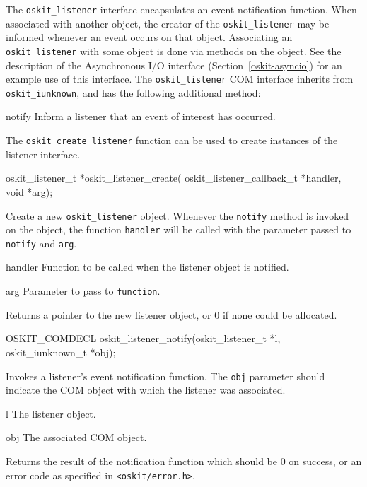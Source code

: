 \label{oskit-listener}
The {\tt oskit_listener} interface encapsulates an event notification function.
When associated with another object, the creator of the \texttt{oskit_listener}
may be informed whenever an event occurs on that object.
Associating an \texttt{oskit_listener} with some object is done via methods
on the object.
See the description of the Asynchronous I/O interface
(Section~\ref{oskit-asyncio}) for an example use of this interface.
The {\tt oskit_listener} COM interface inherits from {\tt oskit_iunknown},
and has the following additional method:
\begin{csymlist}
\item[notify]
	Inform a listener that an event of interest has occurred.
\end{csymlist}
The \texttt{oskit_create_listener} function can be used to create instances of
the listener interface.

\begin{apisyn}

	\funcproto oskit_listener_t *oskit_listener_create(
		oskit_listener_callback_t *handler, void *arg);
\end{apisyn}
\begin{apidesc}
	Create a new \texttt{oskit_listener} object.
	Whenever the \texttt{notify} method is invoked on the object, 
	the function \texttt{handler} will be called with the parameter
	passed to \texttt{notify} and \texttt{arg}.
\end{apidesc}
\begin{apiparm}
	\item[handler]
		Function to be called when the listener object is notified.
	\item[arg]
		Parameter to pass to \texttt{function}.
\end{apiparm}
\begin{apiret}
	Returns a pointer to the new listener object,
	or 0 if none could be allocated.
\end{apiret}

\begin{apisyn}

	\funcproto OSKIT_COMDECL
	oskit_listener_notify(oskit_listener_t *l, oskit_iunknown_t *obj);
\end{apisyn}
\begin{apidesc}
	Invokes a listener's event notification function.
	The \texttt{obj} parameter should indicate the COM object with
	which the listener was associated.
\end{apidesc}
\begin{apiparm}
	\item[l]
		The listener object.
	\item[obj]
		The associated COM object.
\end{apiparm}
\begin{apiret}
	Returns the result of the notification function which should be
	0 on success, or an error code as specified in
	{\tt <oskit/error.h>}.
\end{apiret}

